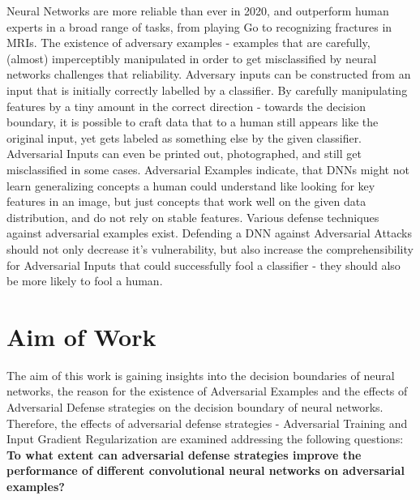 \documentclass[draft,final]{vutinfth} %
\begin{document}
Neural Networks are more reliable than ever in 2020, and outperform human experts in a broad range of tasks, from playing Go to recognizing fractures in MRIs.
The existence of adversary examples - examples that are carefully, (almost) imperceptibly manipulated in order to get misclassified by neural networks challenges that reliability.
Adversary inputs can be constructed from an input that is initially correctly labelled by a classifier.
By carefully manipulating features by a tiny amount in the correct direction - towards the decision boundary, it is possible to
craft data that to a human still appears like the original input, yet gets labeled as something else by the given classifier.
Adversarial Inputs can even be printed out, photographed, and still get misclassified in some cases.
Adversarial Examples indicate, that DNNs might not learn generalizing concepts a human could understand like looking for key features in an image, but just concepts that work well on the given data distribution, and do not rely on stable features.
Various defense techniques against adversarial examples exist.
Defending a DNN against Adversarial Attacks should not only decrease it's vulnerability, but also increase the comprehensibility for Adversarial Inputs that could successfully fool a classifier - they should also be more likely to fool a human.

\section{Aim of Work}

The aim of this work is gaining insights into the decision boundaries of neural networks, the reason for the existence of Adversarial Examples and the effects of Adversarial Defense strategies on the decision boundary of neural networks.
Therefore, the effects of adversarial defense strategies - Adversarial Training and Input Gradient Regularization are examined addressing the following questions: 
\textbf{To what extent can adversarial defense strategies improve the performance of different convolutional neural networks on adversarial examples?} \\
\end{document}
